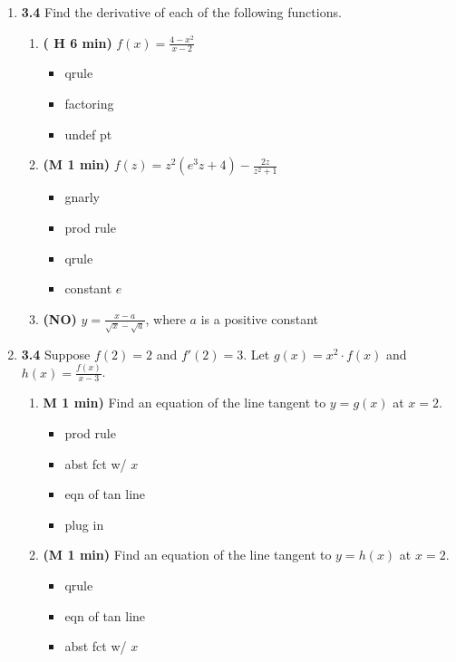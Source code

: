 \documentclass[12pt]{article}
\begin{document}
\begin{enumerate}[1.]
\item {\bf 3.4} Find the derivative of each of the following functions.
\begin{enumerate}
	\item {\bf ( H 6 min)} $\displaystyle f(x)=\frac{4-x^2}{x-2}$
	{\bf\begin{itemize}
\item qrule
\item factoring
\item undef pt
\end{itemize}}
	\item {\bf (M 1 min)} $\displaystyle f(z)=z^2(e^3z+4)-\frac{2z}{z^2+1}$
	{\bf\begin{itemize}
\item gnarly
\item prod rule
\item qrule
\item constant $e$
\end{itemize}}
	\item {\bf (NO)} $\displaystyle y=\frac{x-a}{\sqrt x-\sqrt a}$, where $a$ is a positive constant
\end{enumerate}

\item {\bf 3.4} Suppose $f(2)=2$ and $f'(2)=3$.  Let $g(x)=x^2\cdot f(x)$ and $h(x)=\displaystyle\frac{f(x)}{x-3}$.
\begin{enumerate}
	\item {\bf M 1 min)} Find an equation of the line tangent to $y=g(x)$ at $x=2$.
	{\bf\begin{itemize}
\item prod rule
\item abst fct w/ $x$
\item eqn of tan line
\item plug in
\end{itemize}}	
	\item {\bf (M 1 min)} Find an equation of the line tangent to $y=h(x)$ at $x=2$.
	{\bf\begin{itemize}
\item qrule
\item eqn of tan line
\item abst fct w/ $x$
\end{itemize}}
\end{enumerate}


\end{enumerate}
\end{document}
